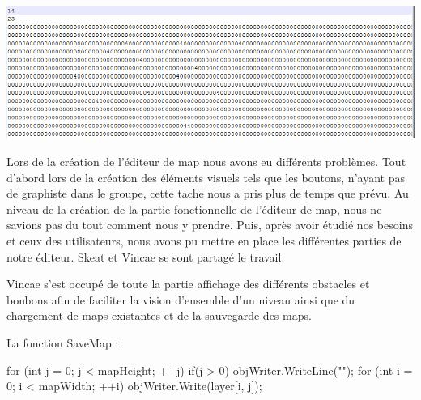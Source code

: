 \documentclass [11pt]{report}
\begin{document}
						
						\vspace{10mm}
						
						\begin{center}
							\includegraphics[scale = 0.6]{images/lvl.png}
						\end{center}
						
						\vspace{10mm}
			
			
		
			 	
			 \indent Lors de la création de l'éditeur de map nous avons eu différents problèmes. Tout d'abord lors de la création des éléments visuels tels que les boutons, n'ayant pas de graphiste dans le groupe, cette tache nous a pris plus de temps que prévu. Au niveau de la création de la partie fonctionnelle de l'éditeur de map, nous ne savions pas du tout comment nous y prendre. Puis, après avoir étudié nos besoins et ceux des utilisateurs, nous avons pu mettre en place les différentes parties de notre éditeur. Skeat et Vincae se sont partagé le travail.
			 
			 Vincae s'est occupé de toute la partie affichage des différents obstacles et bonbons afin de faciliter la vision d'ensemble d'un niveau ainsi que du chargement de maps existantes et de la sauvegarde des maps.\\
			 
			 
			 
	\newpage
		
	\noindent La fonction SaveMap : 
			 
	 \begin{mylisting}
	
      for (int j = 0; j < mapHeight; ++j)
      {
        if(j > 0)
           objWriter.WriteLine("");
        for (int i = 0; i < mapWidth; ++i)
        {
           objWriter.Write(layer[i, j]);
        }
      }
      
	\end{mylisting}
		
		
		\vspace{10mm}
		
		
		
\end{document}
